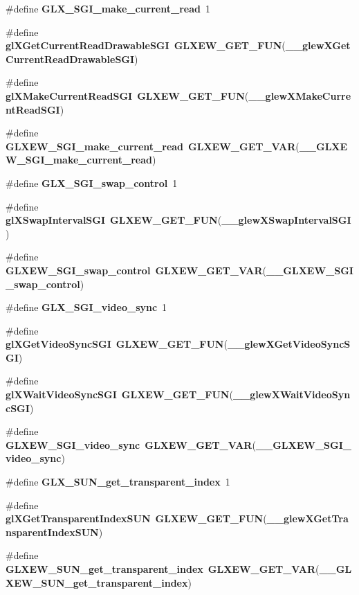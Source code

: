 \begin{DoxyCompactItemize}
\#define {\bf G\+L\+X\+\_\+\+S\+G\+I\+\_\+make\+\_\+current\+\_\+read}~1
\item 
\#define {\bf gl\+X\+Get\+Current\+Read\+Drawable\+S\+GI}~{\bf G\+L\+X\+E\+W\+\_\+\+G\+E\+T\+\_\+\+F\+UN}({\bf \+\_\+\+\_\+glew\+X\+Get\+Current\+Read\+Drawable\+S\+GI})
\item 
\#define {\bf gl\+X\+Make\+Current\+Read\+S\+GI}~{\bf G\+L\+X\+E\+W\+\_\+\+G\+E\+T\+\_\+\+F\+UN}({\bf \+\_\+\+\_\+glew\+X\+Make\+Current\+Read\+S\+GI})
\item 
\#define {\bf G\+L\+X\+E\+W\+\_\+\+S\+G\+I\+\_\+make\+\_\+current\+\_\+read}~{\bf G\+L\+X\+E\+W\+\_\+\+G\+E\+T\+\_\+\+V\+AR}({\bf \+\_\+\+\_\+\+G\+L\+X\+E\+W\+\_\+\+S\+G\+I\+\_\+make\+\_\+current\+\_\+read})
\item 
\#define {\bf G\+L\+X\+\_\+\+S\+G\+I\+\_\+swap\+\_\+control}~1
\item 
\#define {\bf gl\+X\+Swap\+Interval\+S\+GI}~{\bf G\+L\+X\+E\+W\+\_\+\+G\+E\+T\+\_\+\+F\+UN}({\bf \+\_\+\+\_\+glew\+X\+Swap\+Interval\+S\+GI})
\item 
\#define {\bf G\+L\+X\+E\+W\+\_\+\+S\+G\+I\+\_\+swap\+\_\+control}~{\bf G\+L\+X\+E\+W\+\_\+\+G\+E\+T\+\_\+\+V\+AR}({\bf \+\_\+\+\_\+\+G\+L\+X\+E\+W\+\_\+\+S\+G\+I\+\_\+swap\+\_\+control})
\item 
\#define {\bf G\+L\+X\+\_\+\+S\+G\+I\+\_\+video\+\_\+sync}~1
\item 
\#define {\bf gl\+X\+Get\+Video\+Sync\+S\+GI}~{\bf G\+L\+X\+E\+W\+\_\+\+G\+E\+T\+\_\+\+F\+UN}({\bf \+\_\+\+\_\+glew\+X\+Get\+Video\+Sync\+S\+GI})
\item 
\#define {\bf gl\+X\+Wait\+Video\+Sync\+S\+GI}~{\bf G\+L\+X\+E\+W\+\_\+\+G\+E\+T\+\_\+\+F\+UN}({\bf \+\_\+\+\_\+glew\+X\+Wait\+Video\+Sync\+S\+GI})
\item 
\#define {\bf G\+L\+X\+E\+W\+\_\+\+S\+G\+I\+\_\+video\+\_\+sync}~{\bf G\+L\+X\+E\+W\+\_\+\+G\+E\+T\+\_\+\+V\+AR}({\bf \+\_\+\+\_\+\+G\+L\+X\+E\+W\+\_\+\+S\+G\+I\+\_\+video\+\_\+sync})
\item 
\#define {\bf G\+L\+X\+\_\+\+S\+U\+N\+\_\+get\+\_\+transparent\+\_\+index}~1
\item 
\#define {\bf gl\+X\+Get\+Transparent\+Index\+S\+UN}~{\bf G\+L\+X\+E\+W\+\_\+\+G\+E\+T\+\_\+\+F\+UN}({\bf \+\_\+\+\_\+glew\+X\+Get\+Transparent\+Index\+S\+UN})
\item 
\#define {\bf G\+L\+X\+E\+W\+\_\+\+S\+U\+N\+\_\+get\+\_\+transparent\+\_\+index}~{\bf G\+L\+X\+E\+W\+\_\+\+G\+E\+T\+\_\+\+V\+AR}({\bf \+\_\+\+\_\+\+G\+L\+X\+E\+W\+\_\+\+S\+U\+N\+\_\+get\+\_\+transparent\+\_\+index})
\item 

\end{DoxyCompactItemize}
